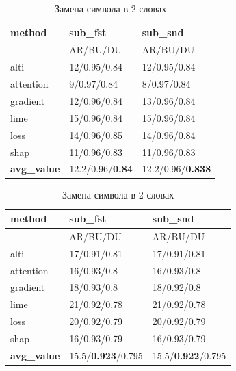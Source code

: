 \begin{table}[H]
  \centering
  \begin{minipage}[t]{0.49\textwidth} %
    \centering
    \caption{Замена символа в 1 слове}
    {\fontsize{9pt}{15pt}\selectfont
    \begin{tabularx}{\textwidth}{|l|X|X|}
        \hline
         method            & sub\_fst          & sub\_snd          \\
        \hline
         & AR/BU/DU & AR/BU/DU  \\
        \hline
         alti      & 12/0.95/0.84 & 12/0.95/0.84 \\
        \hline
         attention & 9/0.97/0.84  & 8/0.97/0.84  \\
        \hline
         gradient  & 12/0.96/0.84 & 13/0.96/0.84 \\
        \hline
         lime      & 15/0.96/0.84 & 15/0.96/0.84 \\
        \hline
         loss      & 14/0.96/0.85 & 14/0.96/0.84 \\
        \hline
         shap      & 11/0.96/0.83 & 11/0.96/0.83 \\
        \hline
         \textbf{avg\_value} & 12.2/0.96/\textbf{0.84} & 12.2/0.96/\textbf{0.838} \\
        \hline
    \end{tabularx}
    }
  \end{minipage}
  \hfill %
  \begin{minipage}[t]{0.49\textwidth} %
    \centering
    \caption{Замена символа в 2 словах}
    {\fontsize{9pt}{15pt}\selectfont
    \begin{tabularx}{\textwidth}{|l|X|X|}
        \hline
         method            & sub\_fst          & sub\_snd          \\
        \hline
         & AR/BU/DU & AR/BU/DU  \\
        \hline
         alti      & 17/0.91/0.81 & 17/0.91/0.81 \\
        \hline
         attention & 16/0.93/0.8  & 16/0.93/0.8  \\
        \hline
         gradient  & 18/0.93/0.8  & 18/0.92/0.8  \\
        \hline
         lime      & 21/0.92/0.78  & 21/0.92/0.78 \\
        \hline
         loss      & 20/0.92/0.79 & 20/0.92/0.79 \\
        \hline
         shap      & 16/0.93/0.79 & 16/0.93/0.79 \\
        \hline
         \textbf{avg\_value} & 15.5/\textbf{0.923}/0.795 & 15.5/\textbf{0.922}/0.795 \\
        \hline
    \end{tabularx}
    }
  \end{minipage}
\end{table}

